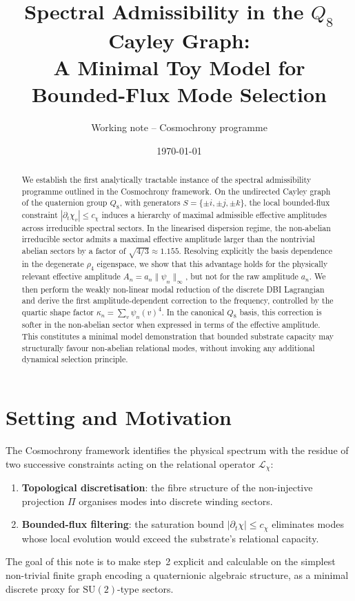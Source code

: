 \documentclass[11pt,a4paper]{article}
\title{Spectral Admissibility in the $Q_8$ Cayley Graph:\\
A Minimal Toy Model for Bounded-Flux Mode Selection}
\author{Working note -- Cosmochrony programme}
\date{\today}
\begin{document}
  \maketitle

  \begin{abstract}
    We establish the first analytically tractable instance of the spectral admissibility
    programme outlined in the Cosmochrony framework.
    On the undirected Cayley graph of the quaternion group $Q_8$, with generators
    $S = \{\pm i, \pm j, \pm k\}$, the local bounded-flux constraint
    $|\partial_t \chi_v| \leq c_\chi$ induces a hierarchy of maximal admissible
    effective amplitudes across irreducible spectral sectors.
    In the linearised dispersion regime, the non-abelian irreducible sector
    admits a maximal effective amplitude larger than the nontrivial abelian sectors
    by a factor of $\sqrt{4/3} \approx 1.155$.
    Resolving explicitly the basis dependence in the degenerate $\rho_4$ eigenspace,
    we show that this advantage holds for the physically relevant effective amplitude
    $A_n = a_n \|\psi_n\|_\infty$, but not for the raw amplitude $a_n$.
    We then perform the weakly non-linear modal reduction of the discrete DBI
    Lagrangian and derive the first amplitude-dependent correction to the frequency,
    controlled by the quartic shape factor $\kappa_n = \sum_v \psi_n(v)^4$.
    In the canonical $Q_8$ basis, this correction is softer in the non-abelian sector
    when expressed in terms of the effective amplitude.
    This constitutes a minimal model demonstration that bounded substrate capacity
    may structurally favour non-abelian relational modes, without invoking any
    additional dynamical selection principle.
  \end{abstract}

  \section{Setting and Motivation}

    The Cosmochrony framework identifies the physical spectrum with the residue of two
    successive constraints acting on the relational operator $\mathcal{L}_\chi$:
    \begin{enumerate}
      \item \textbf{Topological discretisation}: the fibre structure of the non-injective
      projection $\Pi$ organises modes into discrete winding sectors.
      \item \textbf{Bounded-flux filtering}: the saturation bound
      $|\partial_t \chi| \leq c_\chi$ eliminates modes whose local evolution would
      exceed the substrate's relational capacity.
    \end{enumerate}
    The goal of this note is to make step~2 explicit and calculable on the simplest
    non-trivial finite graph encoding a quaternionic algebraic structure,
    as a minimal discrete proxy for $\mathrm{SU}(2)$-type sectors.
\end{document}
